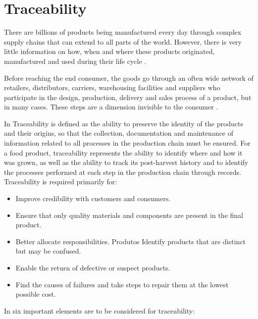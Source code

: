 \section{Traceability}\label{sec:traceability}

There are billions of products being manufactured every day through complex supply chains that can extend to all parts of the world. However, there is very little information on how, when and where these products originated, manufactured and used during their life cycle \cite{horiuchirastreabilidade}.

Before reaching the end consumer, the goods go through an often wide network of retailers, distributors, carriers, warehousing facilities and suppliers who participate in the design, production, delivery and sales process of a product, but in many cases. These steps are a dimension invisible to the consumer \cite{provenance2015}.

In \cite{gryna1998juran, Opara2001} Traceability is defined as the ability to preserve the identity of the products and their origins, so that the collection, documentation and maintenance of information related to all processes in the production chain must be ensured. For a food product, traceability represents the ability to identify where and how it was grown, as well as the ability to track its post-harvest history and to identify the processes performed at each step in the production chain through records. Traceability is required primarily for:
\begin{itemize}
\item Improve credibility with customers and consumers.
\item Ensure that only quality materials and components are present in the final product.
\item Better allocate responsibilities.
Produtos Identify products that are distinct but may be confused.
\item Enable the return of defective or suspect products.
\item Find the causes of failures and take steps to repair them at the lowest possible cost.
\end{itemize}

In \cite{opara2003traceability} six important elements are to be considered for traceability:

